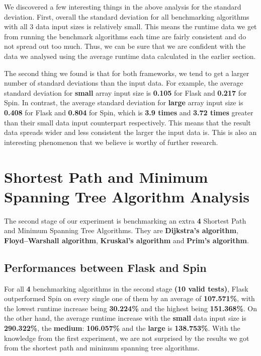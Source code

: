We discovered a few interesting things in the above analysis for the standard deviation. First, overall the standard deviation for all benchmarking algorithms with all 3 data input sizes is relatively small. This means the runtime data we get from running the benchmark algorithms each time are fairly consistent and do not spread out too much. Thus, we can be sure that we are confident with the data we analysed using the average runtime data calculated in the earlier section.

The second thing we found is that for both frameworks, we tend to get a larger number of standard deviations than the input data. For example, the average standard deviation for \textbf{small} array input size is \textbf{0.105} for Flask and \textbf{0.217} for Spin. In contrast, the average standard deviation for \textbf{large} array input size is \textbf{0.408} for Flask and \textbf{0.804} for Spin, which is \textbf{3.9 times} and \textbf{3.72 times} greater than their small data input counterpart respectively. This means that the result data spreads wider and less consistent the larger the input data is. This is also an interesting phenomenon that we believe is worthy of further research.

\bigskip
\section{Shortest Path and Minimum Spanning Tree Algorithm Analysis}

The second stage of our experiment is benchmarking an extra \textbf{4} Shortest Path and Minimum Spanning Tree Algorithms. They are \textbf{Dijkstra's algorithm}, \textbf{Floyd–Warshall algorithm}, \textbf{Kruskal's algorithm} and \textbf{Prim's algorithm}.

\subsection{Performances between Flask and Spin}

For all \textbf{4} benchmarking algorithms in the second stage \textbf{(10 valid tests)}, Flask outperformed Spin on every single one of them by an average of \textbf{107.571\%}, with the lowest runtime increase being \textbf{30.224\%} and the highest being \textbf{151.368\%}. On the other hand, the average runtime increase with the \textbf{small} data input size is \textbf{290.322\%}, the \textbf{medium}: \textbf{106.057\%} and the \textbf{large} is \textbf{138.753\%}. With the knowledge from the first experiment, we are not surprised by the results we got from the shortest path and minimum spanning tree algorithms.

